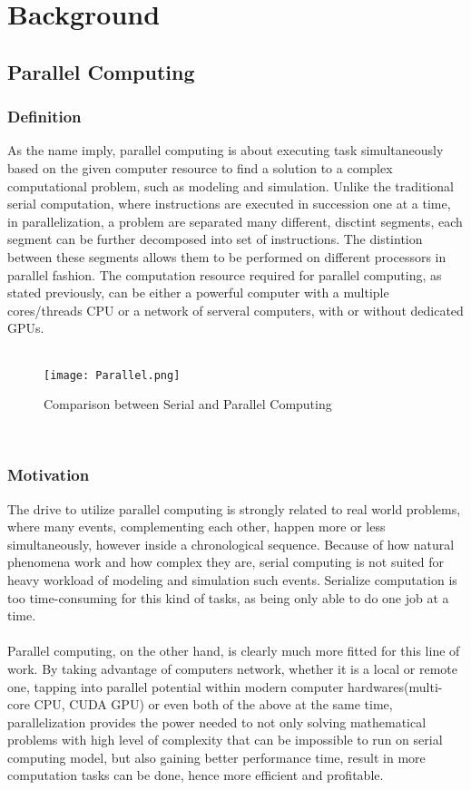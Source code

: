 \chapter{Background}

\section{Parallel Computing}

\subsection{Definition}

As the name imply, parallel computing is about executing task simultaneously based on the given computer resource to find a solution to a complex computational problem, such as modeling and simulation. Unlike the traditional serial computation, where instructions are executed in succession one at a time, in parallelization, a problem are separated many different, disctint segments, each segment can be further decomposed into set of instructions. The distintion between these segments allows them to be performed on different processors in parallel fashion. The computation resource required for parallel computing, as stated previously, can be either a powerful computer with a multiple cores/threads CPU or a network of serveral computers, with or without dedicated GPUs. \\
~\\
\begin{figure}[H]
\texttt{[image: Parallel.png]}
\centering
\caption{Comparison between Serial and Parallel Computing}
\end{figure}
~\\

\subsection{Motivation}

The drive to utilize parallel computing is strongly related to real world problems, where many events, complementing each other, happen more or less simultaneously, however inside a chronological sequence. Because of how natural phenomena work and how complex they are, serial computing is not suited for heavy workload of modeling and simulation such events. Serialize computation is too time-consuming for this kind of tasks, as being only able to do one job at a time. \\
~\\
Parallel computing, on the other hand, is clearly much more fitted for this line of work. By taking advantage of computers network, whether it is a local or remote one, tapping into parallel potential within modern computer hardwares(multi-core CPU, CUDA GPU) or even both of the above at the same time, parallelization provides the power needed to not only solving mathematical problems with high level of complexity that can be impossible to run on serial computing model, but also gaining better performance time, result in more computation tasks can be done, hence more efficient and profitable. \\



